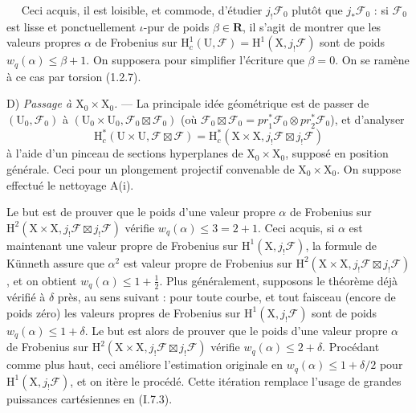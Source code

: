 \documentclass[11pt,leqno]{article}
\newcommand{\Page}[1]{\ifvmode\noindent\else\unskip\ \fi{\footnotesize\textcolor{gray}{[p.\,#1]}}\ \ignorespaces}
\begin{document}
\Page{140}
Ceci acquis, il est loisible, et commode, d’étudier \(j_!\mathscr{F}_0\) plutôt que \(j_*\mathscr{F}_0\) : si \(\mathscr{F}_0\) est lisse et ponctuellement \(\iota\)-pur de poids \(\beta\in\mathbf{R}\), il s’agit de montrer que les valeurs propres \(\alpha\) de Frobenius sur \(\mathrm{H}_c^1(\mathrm{U},\mathscr{F})=\mathrm{H}^1(\mathrm{X},j_!\mathscr{F})\) sont de poids \(w_q(\alpha)\leq\beta+1\). On supposera pour simplifier l’écriture que \(\beta=0\). On se ramène à ce cas par torsion (1.2.7).

D) \textit{Passage à \(\mathrm{X}_0\times\mathrm{X}_0\).} — La principale idée géométrique est de passer de \((\mathrm{U}_0,\mathscr{F}_0)\) à \((\mathrm{U}_0\times\mathrm{U}_0,\mathscr{F}_0\boxtimes\mathscr{F}_0)\) (où \(\mathscr{F}_0\boxtimes\mathscr{F}_0=\mathit{pr}_1^*\mathscr{F}_0\otimes\mathit{pr}_2^*\mathscr{F}_0\)), et d’analyser
\[
\mathrm{H}_c^*(\mathrm{U}\times\mathrm{U},\mathscr{F}\boxtimes\mathscr{F})
=
\mathrm{H}_c^*(\mathrm{X}\times\mathrm{X},j_!\mathscr{F}\boxtimes j_!\mathscr{F})
\]
à l’aide d’un pinceau de sections hyperplanes de \(\mathrm{X}_0\times\mathrm{X}_0\), supposé en position générale. Ceci pour un plongement projectif convenable de \(\mathrm{X}_0\times\mathrm{X}_0\). On suppose effectué le nettoyage A(i).

Le but est de prouver que le poids d’une valeur propre \(\alpha\) de Frobenius sur \(\mathrm{H}^2(\mathrm{X}\times\mathrm{X},j_!\mathscr{F}\boxtimes j_!\mathscr{F})\) vérifie \(w_q(\alpha)\leq 3=2+1\). Ceci acquis, si \(\alpha\) est maintenant une valeur propre de Frobenius sur \(\mathrm{H}^1(\mathrm{X},j_!\mathscr{F})\), la formule de Künneth assure que \(\alpha^2\) est valeur propre de Frobenius sur \(\mathrm{H}^2(\mathrm{X}\times\mathrm{X},j_!\mathscr{F}\boxtimes j_!\mathscr{F})\), et on obtient \(w_q(\alpha)\leq 1+\frac{1}{2}\). Plus généralement, supposons le théorème déjà vérifié à \(\delta\) près, au sens suivant : pour toute courbe, et tout faisceau (encore de poids zéro) les valeurs propres de Frobenius sur \(\mathrm{H}^1(\mathrm{X},j_!\mathscr{F})\) sont de poids \(w_q(\alpha)\leq 1+\delta\). Le but est alors de prouver que le poids d’une valeur propre \(\alpha\) de Frobenius sur \(\mathrm{H}^2(\mathrm{X}\times\mathrm{X},j_!\mathscr{F}\boxtimes j_!\mathscr{F})\) vérifie \(w_q(\alpha)\leq 2+\delta\). Procédant comme plus haut, ceci améliore l’estimation originale en \(w_q(\alpha)\leq 1+\delta/2\) pour \(\mathrm{H}^1(\mathrm{X},j_!\mathscr{F})\), et on itère le procédé. Cette itération remplace l’usage de grandes puissances cartésiennes en (I.7.3).
\end{document}
